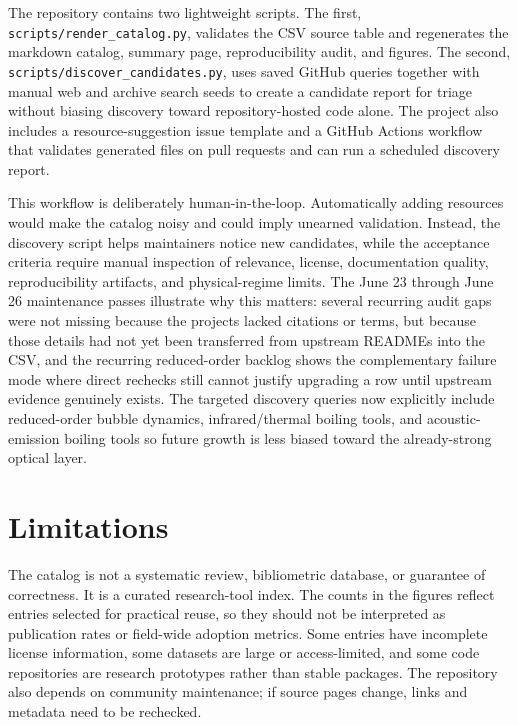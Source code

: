 \documentclass[11pt]{article}
\begin{document}
The repository contains two lightweight scripts. The first, \texttt{scripts/render\_catalog.py}, validates the CSV source table and regenerates the markdown catalog, summary page, reproducibility audit, and figures. The second, \texttt{scripts/discover\_candidates.py}, uses saved GitHub queries together with manual web and archive search seeds to create a candidate report for triage without biasing discovery toward repository-hosted code alone. The project also includes a resource-suggestion issue template and a GitHub Actions workflow that validates generated files on pull requests and can run a scheduled discovery report.

This workflow is deliberately human-in-the-loop. Automatically adding resources would make the catalog noisy and could imply unearned validation. Instead, the discovery script helps maintainers notice new candidates, while the acceptance criteria require manual inspection of relevance, license, documentation quality, reproducibility artifacts, and physical-regime limits. The June 23 through June 26 maintenance passes illustrate why this matters: several recurring audit gaps were not missing because the projects lacked citations or terms, but because those details had not yet been transferred from upstream READMEs into the CSV, and the recurring reduced-order backlog shows the complementary failure mode where direct rechecks still cannot justify upgrading a row until upstream evidence genuinely exists. The targeted discovery queries now explicitly include reduced-order bubble dynamics, infrared/thermal boiling tools, and acoustic-emission boiling tools so future growth is less biased toward the already-strong optical layer.

\section{Limitations}

The catalog is not a systematic review, bibliometric database, or guarantee of correctness. It is a curated research-tool index. The counts in the figures reflect entries selected for practical reuse, so they should not be interpreted as publication rates or field-wide adoption metrics. Some entries have incomplete license information, some datasets are large or access-limited, and some code repositories are research prototypes rather than stable packages. The repository also depends on community maintenance; if source pages change, links and metadata need to be rechecked.
\end{document}
